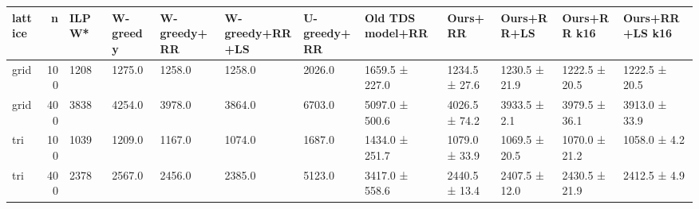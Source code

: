 \begin{tabular}{lrllllllllll}
\toprule
lattice & n & ILP W* & W-greedy & W-greedy+RR & W-greedy+RR+LS & U-greedy+RR & Old TDS model+RR & Ours+RR & Ours+RR+LS & Ours+RR k16 & Ours+RR+LS k16 \\
\midrule
grid & 100 & 1208 & 1275.0 & 1258.0 & 1258.0 & 2026.0 & 1659.5 ± 227.0 & 1234.5 ± 27.6 & 1230.5 ± 21.9 & 1222.5 ± 20.5 & 1222.5 ± 20.5 \\
grid & 400 & 3838 & 4254.0 & 3978.0 & 3864.0 & 6703.0 & 5097.0 ± 500.6 & 4026.5 ± 74.2 & 3933.5 ± 2.1 & 3979.5 ± 36.1 & 3913.0 ± 33.9 \\
tri & 100 & 1039 & 1209.0 & 1167.0 & 1074.0 & 1687.0 & 1434.0 ± 251.7 & 1079.0 ± 33.9 & 1069.5 ± 20.5 & 1070.0 ± 21.2 & 1058.0 ± 4.2 \\
tri & 400 & 2378 & 2567.0 & 2456.0 & 2385.0 & 5123.0 & 3417.0 ± 558.6 & 2440.5 ± 13.4 & 2407.5 ± 12.0 & 2430.5 ± 21.9 & 2412.5 ± 4.9 \\
\bottomrule
\end{tabular}

